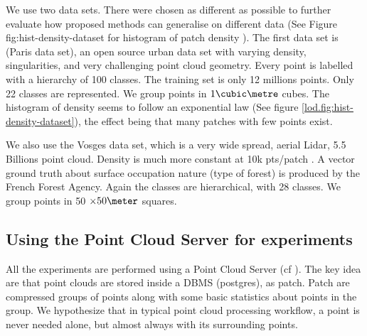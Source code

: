  		We use two data sets. There were chosen as different as possible to further evaluate how proposed methods can generalise on different data (See Figure fig:hist-density-dataset for histogram of patch density ). 
 		The first data set is \cite{IQmulus2014} (Paris data set), an open source urban data set with varying density, singularities, and very challenging point cloud geometry. 
 		Every point is labelled with a hierarchy of 100 classes.
 		The training set is only 12 millions points.
 		Only 22 classes are represented. We group points in $1 \cubic \metre$ cubes.
 		The histogram of density seems to follow an exponential law (See figure \ref{lod.fig:hist-density-dataset}), the effect being that many patches with few points exist. 
 		
 		We also use the Vosges data set, which is a very wide spread, aerial Lidar, 5.5 Billions point cloud. 
 		Density is much more constant at 10k pts/patch .
 		A vector ground truth about surface occupation nature (type of forest) is produced by the French Forest Agency. Again the classes are hierarchical, with 28 classes. 
 		We group points in 50 $\times 50 \meter$ squares.
 		

	\subsection{Using the Point Cloud Server for experiments}
		All the experiments are performed using a Point Cloud Server (cf \cite{Cura2014}).
		The key idea are that point clouds are stored inside a DBMS (postgres), as patch. Patch are compressed groups of points along with some basic statistics about points in the group.
		We hypothesize that in typical point cloud processing workflow, a point is never needed alone, but almost always with its surrounding points.
	
